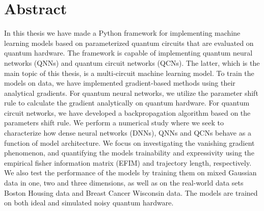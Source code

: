 \chapter*{Abstract}
\thispagestyle{plain}

In this thesis we have made a Python framework for implementing machine learning models based on parameterized quantum circuits that are evaluated on quantum hardware. The framework is capable of implementing quantum neural networks (QNNs) and quantum circuit networks (QCNs). The latter, which is the main topic of this thesis, is a multi-circuit machine learning model. To train the models on data, we have implemented gradient-based methods using their analytical gradients. For quantum neural networks, we utilize the parameter shift rule to calculate the gradient analytically on quantum hardware. For quantum circuit networks, we have developed a backpropagation algorithm based on the parameters shift rule. We perform a numerical study where we seek to characterize how dense neural networks (DNNs), QNNs and QCNs behave as a function of model architecture. We focus on investigating the vanishing gradient phenomenon, and quantifying the models trainability and expressivity using the empirical fisher information matrix (EFIM) and trajectory length, respectively. We also test the performance of the models by training them on mixed Gaussian data in one, two and three dimensions, as well as on the real-world data sets Boston Housing data and Breast Cancer Wisconsin data. The models are trained on both ideal and simulated noisy quantum hardware.

